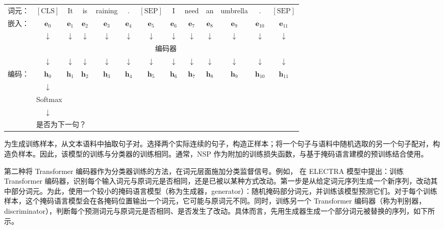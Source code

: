 \vspace{0.5em}
\begin{center}
\begingroup
\renewcommand{\arraystretch}{1.2}
\setlength{\tabcolsep}{3pt}
\begin{tabular}{r c c c c c c c c c c c c}
词元：& {\color{red} $[\mathrm{CLS}]$} & It & is & raining & . & $[\mathrm{SEP}]$ & I & need & an & umbrella & . & $[\mathrm{SEP}]$ \\
嵌入：& {\color{red} $\mathbf{e}_0$} & $\mathbf{e}_1$ & $\mathbf{e}_2$ & $\mathbf{e}_3$ & $\mathbf{e}_4$ & $\mathbf{e}_5$ & $\mathbf{e}_6$ & $\mathbf{e}_7$ & $\mathbf{e}_8$ & $\mathbf{e}_9$ & $\mathbf{e}_{10}$ & $\mathbf{e}_{11}$ \\
 & {\color{red} $\downarrow$} & $\downarrow$ & $\downarrow$ & $\downarrow$ & $\downarrow$ & $\downarrow$ & $\downarrow$ & $\downarrow$ & $\downarrow$ & $\downarrow$ & $\downarrow$ & $\downarrow$ \\ \cline{2-13}
& \multicolumn{12}{|c|}{编码器} \\ \cline{2-13}
 & {\color{red} $\downarrow$} & $\downarrow$ & $\downarrow$ & $\downarrow$ & $\downarrow$ & $\downarrow$ & $\downarrow$ & $\downarrow$ & $\downarrow$ & $\downarrow$ & $\downarrow$ & $\downarrow$ \\
 编码：& {\color{red} $\mathbf{h}_0$} & $\mathbf{h}_1$ & $\mathbf{h}_2$ & $\mathbf{h}_3$ & $\mathbf{h}_4$ & $\mathbf{h}_5$ & $\mathbf{h}_6$ & $\mathbf{h}_7$ & $\mathbf{h}_8$ & $\mathbf{h}_9$ & $\mathbf{h}_{10}$ & $\mathbf{h}_{11}$ \\
 & $\downarrow$ \\
 & \multicolumn{3}{l}{Softmax} \\
 & $\downarrow$ \\
 & \multicolumn{3}{l}{是否为下一句？}
\end{tabular}
\endgroup
\end{center}
\vspace{0.5em}

为生成训练样本，从文本语料中抽取句子对。选择两个实际连续的句子，构造正样本；将一个句子与语料中随机选取的另一个句子配对，构造负样本。因此，该模型的训练与分类器的训练相同。通常，NSP 作为附加的训练损失函数，与基于掩码语言建模的预训练结合使用。

第二种将 Transformer 编码器作为分类器训练的方法，在词元层面施加分类监督信号。例如，\citet{clark-etal:2019electra} 在 ELECTRA 模型中提出：训练 Transformer 编码器，识别每个输入词元与原词元是否相同，还是已被以某种方式改动。第一步是从给定词元序列生成一个新序列，改动其中部分词元。为此，使用一个较小的掩码语言模型（称为生成器，generator）：随机掩码部分词元，并训练该模型预测它们。对于每个训练样本，这个掩码语言模型会在各掩码位置输出一个词元，它可能与原词元不同。同时，训练另一个 Transformer 编码器（称为判别器，discriminator），判断每个预测词元与原词元是否相同、是否发生了改动。具体而言，先用生成器生成一个部分词元被替换的序列，如下所示。

